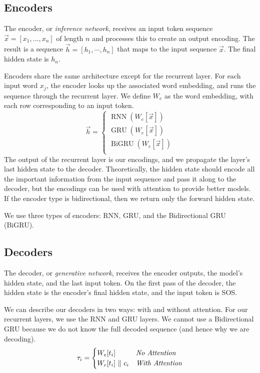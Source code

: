 \documentclass[twoside,twocolumn]{article}
\begin{document}
\subsection{Encoders}
The encoder, or \emph{inference network}, receives an input token sequence
$\vec{x} = \left[{x_1,\hdots, x_n}\right]$ of length $n$ and processes
this to create an output encoding. The result is a sequence
$\vec{h} = \left[{h_1, \cdots, h_{n}}\right]$ that
maps to the input sequence $\vec{x}$. The final hidden state is $h_n$.

Encoders share the same architecture except for the recurrent layer.
For each input word $x_j$, the encoder looks up the associated word embedding,
and runs the sequence through the recurrent layer. We define $W_e$ as the word
embedding, with each row corresponding to an input token.
\begin{equation}
  \vec{h} = \begin{cases}
    \operatorname{RNN} (W_e[\vec{x}]) \\
    \operatorname{GRU} (W_e[\vec{x}]) \\
    \operatorname{BiGRU} (W_e[\vec{x}]) \\
  \end{cases}
\end{equation}
The output of the recurrent layer is our encodings, and we propagate
the layer's last hidden state to the decoder. Theoretically, the hidden
state should encode all the important information from the input sequence
and pass it along to the decoder, but the
encodings can be used with attention to provide better models. If the encoder
type is bidirectional, then we return only the forward hidden state.

We use three types of encoders: RNN, GRU, and the Bidirectional GRU (BiGRU).
\subsection{Decoders}
The decoder, or \emph{generative network}, receives the encoder outputs, the
model's hidden state, and the last input token. On the first pass of the
decoder, the hidden state is the encoder's final hidden state, and the
input token is SOS.

We can describe our decoders in two ways: with and without attention. For
our recurrent layers, we use the RNN and GRU layers. We cannot use a
Bidirectional GRU because we do not know the full decoded sequence
(and hence why we are decoding).
\begin{equation}
  \tau_i = \begin{cases}
    W_e[t_i] & \emph{No Attention} \\
    W_e[t_i] \,\, \Vert \,\, c_i & \emph{With Attention} \\
  \end{cases}
\end{equation}
\end{document}
